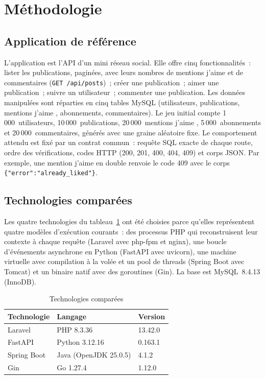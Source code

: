 \documentclass[conference,a4paper]{IEEEtran}
\begin{document}
\section{Méthodologie}\label{sec:methodo}
\subsection{Application de référence}
L'application est l'API d'un mini réseau social. Elle offre cinq
fonctionnalités~: lister les publications, paginées, avec leurs nombres
de mentions \og j'aime \fg{} et de commentaires (\texttt{GET
/api/posts})~; créer une publication~; aimer une publication~; suivre
un utilisateur~; commenter une publication. Les données manipulées sont
réparties en cinq tables MySQL (utilisateurs, publications, mentions
\og j'aime \fg, abonnements, commentaires). Le jeu initial compte
1\,000~utilisateurs, 10\,000~publications, 20\,000~mentions
\og j'aime \fg, 5\,000~abonnements et 20\,000~commentaires, générés avec
une graine aléatoire fixe. Le comportement attendu est fixé par un
contrat commun~: requête SQL exacte de chaque route, ordre des
vérifications, codes HTTP (200, 201, 400, 404, 409) et corps JSON.
Par exemple, une mention \og j'aime \fg{} en double renvoie le code 409
avec le corps \texttt{\{"error":"already\_liked"\}}.

\subsection{Technologies comparées}
Les quatre technologies du tableau~\ref{tab:techno} ont été choisies
parce qu'elles représentent quatre modèles d'exécution courants~: des
processus PHP qui reconstruisent leur contexte à chaque requête
(Laravel avec php-fpm et nginx), une boucle d'événements asynchrone en
Python (FastAPI avec uvicorn), une machine virtuelle avec compilation à
la volée et un pool de threads (Spring Boot avec Tomcat) et un binaire
natif avec des goroutines (Gin). La base est MySQL~8.4.13 (InnoDB).

\begin{table}[htbp]
\caption{Technologies comparées}
\label{tab:techno}
\centering
\begin{tabular}{@{}lll@{}}
\toprule
\textbf{Technologie} & \textbf{Langage} & \textbf{Version} \\
\midrule
Laravel & PHP 8.3.36 & 13.42.0 \\
FastAPI & Python 3.12.16 & 0.163.1 \\
Spring Boot & Java (OpenJDK 25.0.5) & 4.1.2 \\
Gin & Go 1.27.4 & 1.12.0 \\
\bottomrule
\end{tabular}
\end{table}
\end{document}

